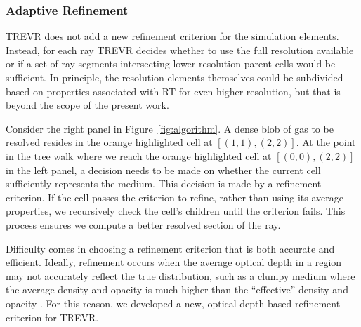 \documentclass[fleq,usenatbib]{mnras}
\newcommand{\acro}{TREVR}
\begin{document}
{\subsubsection{Adaptive Refinement}\label{sec:adref}

\acro{} does not add a new refinement criterion for the simulation elements.
Instead, for each ray \acro{} decides whether to use the full resolution 
available or if a set of ray segments intersecting lower resolution parent 
cells would be sufficient. In principle, the resolution elements themselves 
could be subdivided based on properties associated with RT for even higher 
resolution, but that is beyond the scope of the present work.

Consider the right panel in Figure~\ref{fig:algorithm}. A dense blob of gas 
to be resolved resides in the orange highlighted cell at $[(1,1),(2,2)]$. At 
the point in the tree walk where we reach the orange highlighted cell at 
$[(0,0),(2,2)]$ in the left panel, a decision needs to be made on whether the 
current cell sufficiently represents the medium. This decision is made by a 
refinement criterion. If the cell passes the criterion to refine, rather than 
using its average properties, we recursively check the cell's children until 
the criterion fails. This process ensures we compute a better resolved section 
of the ray. 

Difficulty comes in choosing a refinement criterion that is both accurate and 
efficient. Ideally, refinement occurs when the average optical depth 
in a region may not accurately reflect the true distribution, such as a clumpy 
medium where the average density and opacity is much higher than the 
``effective'' density and opacity \citep{varosiDwek99, hegmanKegel03}. For 
this reason, we developed a new, optical depth-based refinement criterion 
for \acro{}.

}
\end{document}
